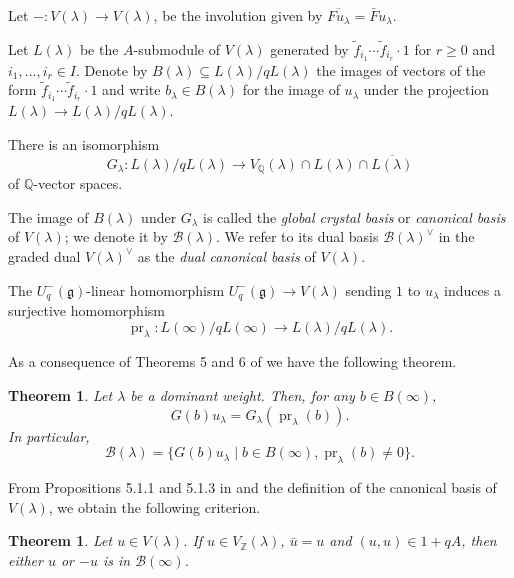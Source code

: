 \documentclass[final]{amsart}
\theoremstyle{plain}
\newtheorem{theorem}[corollary]{Theorem}
\theoremstyle{definition}
\newcommand{\calB}{\mathcal B}
\newcommand{\bbQ}{\mathbb Q}
\newcommand{\bbZ}{\mathbb Z}
\newcommand{\frakg}{\mathfrak g}
\newcommand{\tf}{\tilde f}
\DeclareMathOperator{\pr}{pr}
\begin{document}
Let $-\colon V(\lambda) \to V(\lambda)$, be the involution given by $\overline{F u_\lambda} = \bar F u_\lambda$.

Let $L(\lambda)$ be the $A$-submodule of $V(\lambda)$ generated by $\tf_{i_1}\cdots \tf_{i_r} \cdot 1$ for $r \ge 0$ and $i_1, \dots, i_r \in I$.
Denote by $B(\lambda) \subseteq L(\lambda)/qL(\lambda)$ the images of vectors of the form $\tf_{i_1}\cdots \tf_{i_r} \cdot 1$ and write $b_\lambda \in B(\lambda)$ for the image of $u_\lambda$ under the projection $L(\lambda) \to L(\lambda)/qL(\lambda)$.

There is an isomorphism \cite[Theorem 6]{Kashiwara:CrystalBases-QuantizedUniversalEnvelopingAlgebras}
\[
    G_\lambda\colon L(\lambda)/qL(\lambda) \to V_\bbQ(\lambda) \cap L(\lambda) \cap \overline{L(\lambda)}
\]
of $\bbQ$-vector spaces.

The image of $B(\lambda)$ under $G_\lambda$ is called the \emph{global crystal basis} or \emph{canonical basis} of $V(\lambda)$; we denote it by $\calB(\lambda)$.
We refer to its dual basis $\calB(\lambda)^\vee$ in the graded dual $V(\lambda)^\vee$ as the \emph{dual canonical basis} of $V(\lambda)$.

The $U_q^-(\frakg)$-linear homomorphism $U_q^-(\frakg) \to V(\lambda)$ sending $1$ to $u_\lambda$ induces a surjective homomorphism \cite[Theorem 5]{Kashiwara:CrystalBases-QuantizedUniversalEnvelopingAlgebras}
\begin{equation}
    \pr_\lambda\colon L(\infty)/qL(\infty) \to L(\lambda)/qL(\lambda).
\end{equation}

As a consequence of Theorems 5 and 6 of \cite{Kashiwara:CrystalBases-QuantizedUniversalEnvelopingAlgebras} we have the following theorem.
\begin{theorem}
    \label{theorem:canonical-basis-projection}
    Let $\lambda$ be a dominant weight.
    Then, for any $b\in B(\infty)$,
    \[
        G(b)u_\lambda = G_\lambda(\pr_\lambda(b)).
    \]
    In particular,
    \[
        \calB(\lambda) = \{ G(b)u_\lambda \mid b \in B(\infty), \pr_\lambda(b) \neq 0 \}.
    \]
\end{theorem}

From Propositions 5.1.1 and 5.1.3 in \cite{Kashiwara:CrystalBases-QuantizedUniversalEnvelopingAlgebras} and the definition of the canonical basis of $V(\lambda)$, we obtain the following criterion.
\begin{theorem}
    \label{theorem:canonical-basis-criterion-integrable-highest-weight-module}
    Let $u \in V(\lambda)$. If $u \in V_\bbZ(\lambda)$, $\bar u = u$ and $(u, u) \in 1+qA$, then either $u$ or $-u$ is in $\calB(\infty)$.
\end{theorem}
\end{document}
